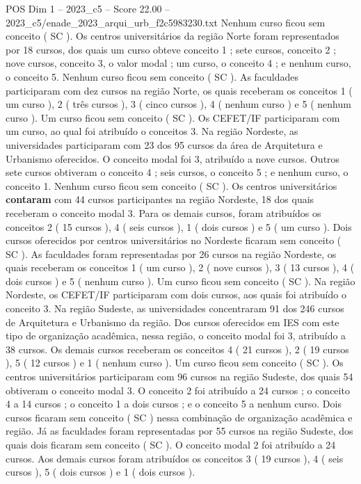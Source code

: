 \begin{textsample}{POS Dim 1 – 2023\_c5 – Score 22.00 – 2023\_c5/enade\_2023\_arqui\_urb\_f2c5983230.txt}
Nenhum curso ficou sem conceito ( SC ).
Os centros universitários da região Norte foram representados por 18 cursos, dos quais um curso obteve conceito 1 ; sete cursos, conceito 2 ; nove cursos, conceito 3, o valor modal ; um curso, o conceito 4 ; e nenhum curso, o conceito 5.
Nenhum curso ficou sem conceito ( SC ).
As faculdades participaram com dez cursos na região Norte, os quais receberam os conceitos 1 ( um curso ), 2 ( três cursos ), 3 ( cinco cursos ), 4 ( nenhum curso ) e 5 ( nenhum curso ).
Um curso ficou sem conceito ( SC ).
Os CEFET/IF participaram com um curso, ao qual foi atribuído o conceitos 3.
Na região Nordeste, as universidades participaram com 23 dos 95 cursos da área de Arquitetura e Urbanismo oferecidos.
O conceito modal foi 3, atribuído a nove cursos.
Outros sete cursos obtiveram o conceito 4 ; seis cursos, o conceito 5 ; e nenhum curso, o conceito 1.
Nenhum curso ficou sem conceito ( SC ).
Os centros universitários \textbf{contaram} com 44 cursos participantes na região Nordeste, 18 dos quais receberam o conceito modal 3.
Para os demais cursos, foram atribuídos os conceitos 2 ( 15 cursos ), 4 ( seis cursos ), 1 ( dois cursos ) e 5 ( um curso ).
Dois cursos oferecidos por centros universitários no Nordeste ficaram sem conceito ( SC ).
As faculdades foram representadas por 26 cursos na região Nordeste, os quais receberam os conceitos 1 ( um curso ), 2 ( nove cursos ), 3 ( 13 cursos ), 4 ( dois cursos ) e 5 ( nenhum curso ).
Um curso ficou sem conceito ( SC ).
Na região Nordeste, os CEFET/IF participaram com dois cursos, aos quais foi atribuído o conceito 3.
Na região Sudeste, as universidades concentraram 91 dos 246 cursos de Arquitetura e Urbanismo da região.
Dos cursos oferecidos em IES com este tipo de organização acadêmica, nessa região, o conceito modal foi 3, atribuído a 38 cursos.
Os demais cursos receberam os conceitos 4 ( 21 cursos ), 2 ( 19 cursos ), 5 ( 12 cursos ) e 1 ( nenhum curso ).
Um curso ficou sem conceito ( SC ).
Os centros universitários participaram com 96 cursos na região Sudeste, dos quais 54 obtiveram o conceito modal 3.
O conceito 2 foi atribuído a 24 cursos ; o conceito 4 a 14 cursos ; o conceito 1 a dois cursos ; e o conceito 5 a nenhum curso.
Dois cursos ficaram sem conceito ( SC ) nessa combinação de organização acadêmica e região.
Já as faculdades foram representadas por 55 cursos na região Sudeste, dos quais dois ficaram sem conceito ( SC ).
O conceito modal 2 foi atribuído a 24 cursos.
Aos demais cursos foram atribuídos os conceitos 3 ( 19 cursos ), 4 ( seis cursos ), 5 ( dois cursos ) e 1 ( dois cursos ).

\end{textsample}
